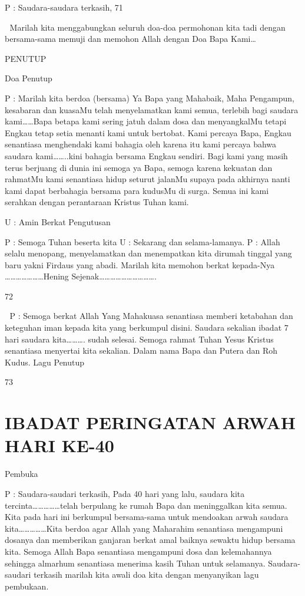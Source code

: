 \documentclass[10pt,a5paper,fancyhdr]{memoir}
\begin{document}
P : Saudara-saudara terkasih, 
71 



Marilah kita menggabungkan seluruh doa-doa permohonan 
kita tadi dengan bersama-sama memuji dan memohon Allah 
dengan Doa Bapa Kami… 

PENUTUP 

Doa Penutup 

P : Marilah kita berdoa (bersama) 
Ya Bapa yang Mahabaik, Maha Pengampun, kesabaran dan 
kuasaMu telah menyelamatkan kami semua, terlebih bagi 
saudara kami……Bapa betapa kami sering jatuh dalam dosa 
dan menyangkalMu tetapi Engkau tetap setia menanti kami 
untuk bertobat. Kami percaya Bapa, Engkau senantiasa 
menghendaki kami bahagia oleh karena itu kami percaya 
bahwa saudara kami……..kini bahagia bersama Engkau 
sendiri. Bagi kami yang masih terus berjuang di dunia ini 
semoga ya Bapa, semoga karena kekuatan dan rahmatMu 
kami senantiasa hidup seturut jalanMu supaya pada akhirnya 
nanti kami dapat berbahagia bersama para kudusMu di surga. 
Semua ini kami serahkan dengan perantaraan Kristus Tuhan 
kami. 

U : Amin 
Berkat Pengutusan 

P : Semoga Tuhan beserta kita 
U : Sekarang dan selama-lamanya. 
P : Allah selalu menopang, menyelamatkan dan menempatkan 
kita dirumah tinggal yang baru yakni Firdaus yang abadi. 
Marilah kita memohon berkat kepada-Nya 
…………………Hening Sejenak…………………………. 

72 



P 
: Semoga berkat Allah Yang Mahakuasa senantiasa 
memberi ketabahan dan keteguhan iman kepada kita yang 
berkumpul disini. Saudara sekalian ibadat 7 hari saudara 
kita………. sudah selesai. Semoga rahmat Tuhan Yesus 
Kristus senantiasa menyertai kita sekalian. Dalam nama 
Bapa dan Putera dan Roh Kudus. 
Lagu Penutup 

73 



\chapter{IBADAT PERINGATAN ARWAH HARI KE-40} 

Pembuka 

P 
: Saudara-saudari terkasih, 
Pada 40 hari yang lalu, saudara kita 
tercinta……………telah berpulang ke rumah Bapa dan 
meninggalkan kita semua. Kita pada hari ini berkumpul 
bersama-sama untuk mendoakan arwah saudara 
kita……………Kita berdoa agar Allah yang Maharahim 
senantiasa mengampuni dosanya dan memberikan ganjaran 
berkat amal baiknya sewaktu hidup bersama kita. Semoga 
Allah Bapa senantiasa mengampuni dosa dan 
kelemahannya sehingga almarhum senantiasa menerima 
kasih Tuhan untuk selamanya. 
Saudara-saudari terkasih marilah kita awali doa kita dengan 
menyanyikan lagu pembukaan. 
\end{document}
